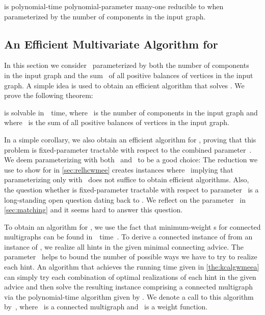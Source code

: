 \begin{theorem}\label{the:redwmeeatowmee}
  \pWMEEA{} is polynomial-time polynomial-parameter many-one reducible to \pWMEE{} when parameterized by the number of components in the input graph.
\end{theorem}

\subsection{An Efficient Multivariate Algorithm for \pWMEECAs{}}\label{sec:multivariatealg}
In this section we consider~\pWMEECAs{} parameterized by both the number of components~ in the input graph and the sum~ of all positive balances of vertices in the input graph. A simple idea is used to obtain an efficient algorithm that solves \pWMEECAs{}. We prove the following theorem:

\begin{theorem}\label{the:kcalgwmeea}
  \pWMEECA{} is solvable in~~time, where~ is the number of components in the input graph and where~ is the sum of all positive balances of vertices in the input graph.
\end{theorem}

In a simple corollary, we also obtain an efficient algorithm for \pWMEEs{}, proving that this problem is fixed-parameter tractable with respect to the combined parameter~. We deem parameterizing with both~ and~ to be a good choice: The reduction we use to show \NPhs{} for \pWMEEs{} in \autoref{sec:relhcwmee} creates instances where~ implying that parameterizing only with~ does not suffice to obtain efficient algorithms. Also, the question whether \pWMEEs{} is fixed-parameter tractable with respect to parameter~ is a long-standing open question dating back to \citet{Fre77}. We reflect on the parameter~ in \autoref{sec:matching} and it seems hard to answer this question. 
 


To obtain an algorithm for \pWMEECAs{}, we use the fact that minimum-weight \EE s for connected multigraphs can be found in~~time~\cite{DMNW10}. To derive a connected instance of \pWMEEs{} from an instance of \pWMEECAs{}, we realize all hints in the given minimal connecting advice. The parameter~ helps to bound the number of possible ways we have to try to realize each hint. An algorithm that achieves the running time given in \autoref{the:kcalgwmeea} can simply try each combination of optimal realizations of each hint in the given advice and then solve the resulting instance comprising a connected multigraph via the polynomial-time algorithm given by \citet{DMNW10}. We denote a call to this algorithm by~, where~ is a connected multigraph and~ is a weight function. 

